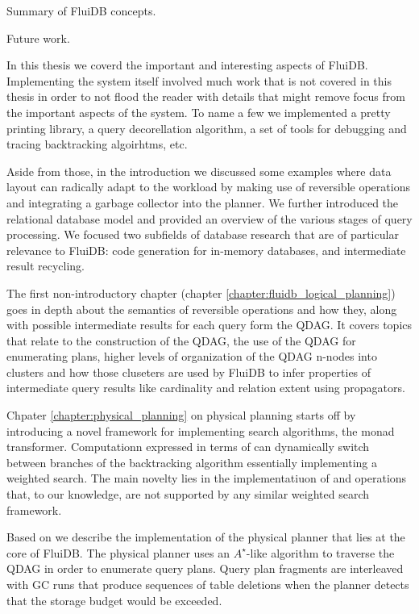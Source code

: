 
\begin{summary}
\item Summary of FluiDB concepts.
\item Future work.
\end{summary}


In this thesis we coverd the important and interesting aspects of
FluiDB. Implementing the system itself involved much work that is not
covered in this thesis in order to not flood the reader with details
that might remove focus from the important aspects of the system. To
name a few we implemented a pretty printing library, a query
decorellation algorithm, a set of tools for debugging and tracing
backtracking algoirhtms, etc.

Aside from those, in the introduction we discussed some examples where
data layout can radically adapt to the workload by making use of
reversible operations and integrating a garbage collector into the
planner. We further introduced the relational database model and
provided an overview of the various stages of query processing. We
focused two subfields of database research that are of particular
relevance to FluiDB: code generation for in-memory databases, and
intermediate result recycling.

The first non-introductory chapter (chapter
\ref{chapter:fluidb_logical_planning}) goes in depth about the
semantics of reversible operations and how they, along with possible
intermediate results for each query form the QDAG. It covers topics
that relate to the construction of the QDAG, the use of the QDAG for
enumerating plans, higher levels of organization of the QDAG n-nodes
into clusters and how those cluseters are used by FluiDB to infer
properties of intermediate query results like cardinality and relation
extent using propagators.

Chpater \ref{chapter:physical_planning} on physical planning starts
off by introducing a novel framework for implementing search
algorithms, the  monad transformer. Computationn expressed
in terms of  can dynamically switch between branches of
the backtracking algorithm essentially implementing a weighted
search. The main novelty lies in the implementatiuon of 
and  operations that, to our knowledge, are not
supported by any similar weighted search framework.

Based on  we describe the implementation of the physical
planner that lies at the core of FluiDB. The physical planner uses an
\(A^{\star}\)-like algorithm to traverse the QDAG in order to
enumerate query plans. Query plan fragments are interleaved with GC
runs that produce sequences of table deletions when the planner
detects that the storage budget would be exceeded.

